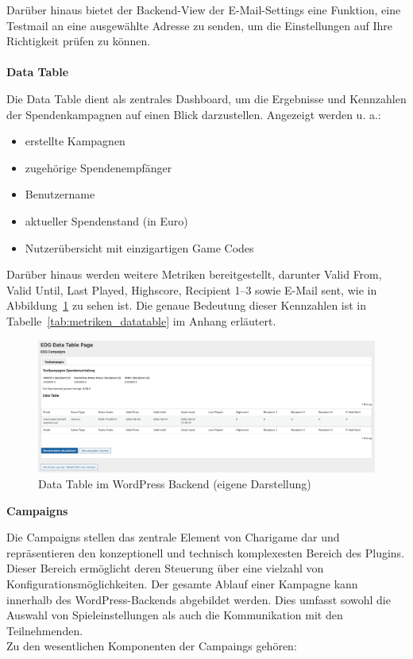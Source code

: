 Darüber hinaus bietet der Backend-View der E-Mail-Settings eine Funktion, eine Testmail an eine ausgewählte Adresse zu senden, um die Einstellungen auf Ihre Richtigkeit prüfen zu können.
\\\\
\textbf{Data Table}

Die Data Table dient als zentrales Dashboard, um die Ergebnisse und Kennzahlen der Spendenkampagnen auf einen Blick darzustellen.
Angezeigt werden u. a.:
\begin{itemize}
    \item erstellte Kampagnen
    \item zugehörige Spendenempfänger
    \item Benutzername
    \item aktueller Spendenstand (in Euro)
    \item Nutzerübersicht mit einzigartigen Game Codes
\end{itemize}
Darüber hinaus werden weitere Metriken bereitgestellt, darunter Valid From, Valid Until, Last Played, Highscore, Recipient 1–3 sowie E-Mail sent, wie in Abbildung~\ref{fig:datatable-backend-legacy} zu sehen ist.
Die genaue Bedeutung dieser Kennzahlen ist in Tabelle~\ref{tab:metriken_datatable} im Anhang erläutert.

\begin{figure}[H]
    \centering
    \includegraphics[width=1\textwidth]{images/legacy_datatable_backend}
    \caption{Data Table im WordPress Backend (eigene Darstellung)}
    \label{fig:datatable-backend-legacy}
\end{figure}

\textbf{Campaigns}

Die Campaigns stellen das zentrale Element von Charigame dar und repräsentieren den konzeptionell und technisch komplexesten Bereich des Plugins.
Dieser Bereich ermöglicht deren Steuerung über eine vielzahl von Konfigurationsmöglichkeiten.
Der gesamte Ablauf einer Kampagne kann innerhalb des WordPress-Backends abgebildet werden.
Dies umfasst sowohl die Auswahl von Spieleinstellungen als auch die Kommunikation mit den Teilnehmenden.
\\
Zu den wesentlichen Komponenten der Campaings gehören:

